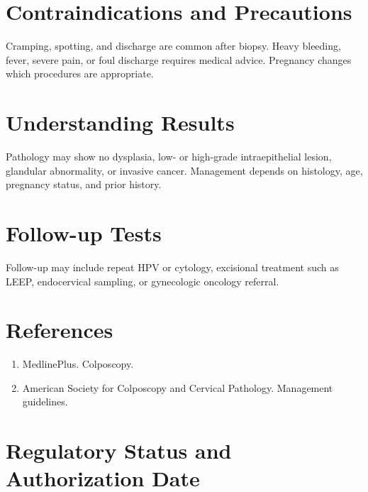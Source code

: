 \section*{Contraindications and Precautions}
Cramping, spotting, and discharge are common after biopsy. Heavy bleeding, fever, severe pain, or foul discharge requires medical advice. Pregnancy changes which procedures are appropriate.
\section*{Understanding Results}
Pathology may show no dysplasia, low- or high-grade intraepithelial lesion, glandular abnormality, or invasive cancer. Management depends on histology, age, pregnancy status, and prior history.
\section*{Follow-up Tests}
Follow-up may include repeat HPV or cytology, excisional treatment such as LEEP, endocervical sampling, or gynecologic oncology referral.
\section*{References}
\begin{enumerate}\item MedlinePlus. Colposcopy.\item American Society for Colposcopy and Cervical Pathology. Management guidelines.\end{enumerate}
\clearpage
\section*{Regulatory Status and Authorization Date}\clearpage
